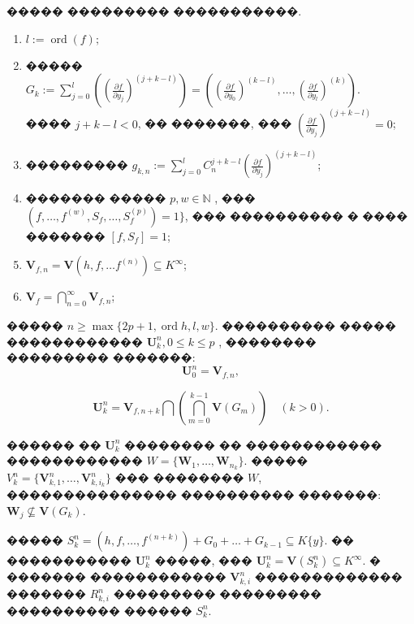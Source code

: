 \documentclass[16pt]{article}
\DeclareMathOperator{\ord}{ord}
\theoremstyle{plain}
\theoremstyle{definition}
\theoremstyle{remark}
\begin{document}
����� ��������� �����������.
\begin{enumerate}


  \item  $l:=\ord (f);$

  \item ����� $G_k := \sum\limits_{j=0}^l\left(\left(\frac{\partial f}{\partial y_j}\right)^{(j+k-l)}\right) = \left(\left(\frac{\partial f}{\partial y_0}\right)^{(k-l)},\ldots ,\left(\frac{\partial f}{\partial y_l}\right)^{(k)} \right)$.
  \\���� $j+k-l<0$, �� �������, ��� $\left(\frac{\partial f}{\partial y_j}\right)^{(j+k-l)} = 0$;

  \item ��������� $g_{k,n}:=\sum\limits_{j=0}^{l}C_n^{j+k - l }\left(\frac{\partial f}{\partial y_j}\right)^{(j+k - l)}$;

  \item  �������  ����� $p,w\in \mathbb{N}$ , ��� $(f,\ldots,f^{(w)},S_f,\ldots,S_f^{(p)})=1\}$, ��� ���������� � ���� �������
  $[f,S_f]=1$;

  \item $\mathbf{V}_{f,n}=\mathbf{V}(h,f,\ldots f^{(n)})\subseteq K^{\infty}$;

  \item
  $\mathbf{V}_{f}=\bigcap\limits_{n=0}^{\infty}\mathbf{V}_{f,n}$;


\end{enumerate}



����� $n \geqslant\max\{ 2p+1,\ord{h},l,w\}$. ����������  ����� ������������ $\mathbf{U}_k^n,0\leqslant k\leqslant p $ , �������� ��������� �������:
$$
\mathbf{U}_{0}^n=\mathbf{V}_{f,n},
$$

$$\mathbf{U}_k^n=\mathbf{V}_{f,n+k}\bigcap\left(\bigcap\limits_{m=0}^{k-1}\mathbf{V}\left(G_m\right)\right)
\quad (k>0).
$$

������ �� $\mathbf{U}^n_k$ �������� �� ������������ ������������ $W=\{\mathbf{W}_{1},\ldots,\mathbf{W}_{n_k}\}$. ����� $V^n_k=\{\mathbf{V}^n_{k,1},\ldots,\mathbf{V}^n_{k,i_k}\}$ ��� �������� $W$, ��������������� ���������� �������: $\mathbf{W}_{j}\not\subseteq\mathbf{V}(G_k)$.

�����  $S_k^n=(h,f,\ldots,f^{(n+k)})+G_0+\ldots+ G_{k-1}\subseteq K\{y\}$. �� ����������� $\mathbf{U}_k^n$ �����, ��� $\mathbf{U}_k^n=\mathbf{V}(S_k^n)\subseteq K^{\infty}$. � ������� ������������ $\mathbf{V}_{k,i}^n$ ������������� ������� $R_{k,i}^n$ ��������� ��������� ���������� ������ $S_k^n$.
\end{document}
